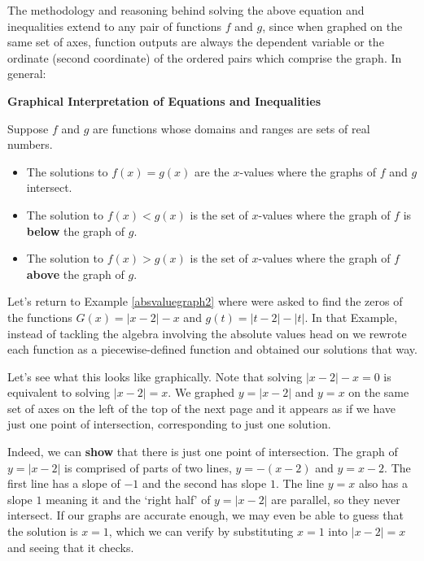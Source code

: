 \documentclass{ximera}
\begin{document}
\medskip

The methodology and reasoning behind solving the above equation and inequalities extend to any pair of functions $f$ and $g$, since when graphed on the same set of axes, function outputs are always the dependent variable or the ordinate (second coordinate) of the ordered pairs which comprise the graph.  In general:

\medskip


\centerline{\textbf{Graphical Interpretation of Equations and Inequalities}}

\medskip

Suppose $f$ and $g$ are functions whose domains and ranges are sets of real numbers.

\begin{itemize}

\item  The solutions to $f(x)=g(x)$ are the $x$-values where the graphs of $f$ and $g$ intersect.

\item  The solution to $f(x) < g(x)$ is the set of $x$-values where the graph of $f$ is \textbf{below} the graph of $g$.

\item  The solution to $f(x) > g(x)$ is the set of $x$-values where the graph of $f$ \textbf{above} the graph of $g$.

\end{itemize}


\medskip

Let's return to  Example \ref{absvaluegraph2} where were asked to find the zeros of the functions $G(x) = |x-2| -x$ and $g(t) = |t-2|-|t|$. In that Example, instead of tackling the algebra involving the absolute values head on we rewrote each function as a piecewise-defined function and obtained our solutions that way.  

\medskip

Let's see what this looks like graphically.  Note that solving $|x-2|-x=0$ is equivalent to solving $|x-2|=x$.  We graphed $y = |x-2|$ and $y=x$ on the same set of axes on the left of the top of the next page and it appears as if we have just one point of intersection, corresponding to just one solution. 

\medskip

Indeed, we can \textbf{show} that there is just one point of intersection.  The graph of  $y = |x-2|$ is comprised of parts of two lines, $y =-(x-2)$ and $y = x-2$. The first line has a slope of $-1$ and the second has slope $1$.  The line $y = x$ also has a slope $1$ meaning it and the `right half' of $y =|x-2|$  are parallel, so they never intersect.  If our graphs are accurate enough, we may even be able to guess that the solution is $x = 1$, which we can verify by  substituting $x = 1$ into $|x-2| = x$ and seeing that it checks.  
\end{document}
